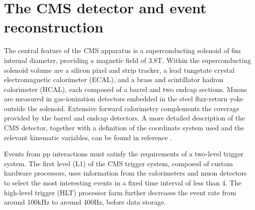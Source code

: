\section{The CMS detector and event reconstruction}
\label{sect:CMSRec}
The central feature of the CMS apparatus is a superconducting solenoid of 6\unit{m} internal diameter, providing a magnetic field of 3.8\unit{T}. Within the superconducting solenoid volume are a silicon pixel and strip tracker, a lead tungstate crystal electromagnetic calorimeter (ECAL), and a brass and scintillator hadron calorimeter (HCAL), each composed of a barrel and two endcap sections. Muons are measured in gas-ionization detectors embedded in the steel flux-return yoke outside the solenoid. Extensive forward calorimetry complements the coverage provided by the barrel and endcap detectors. 
A more detailed description of the CMS detector, together with a definition of the coordinate system used and the relevant kinematic variables, can be found in reference \cite{Chatrchyan:2008zzk}.


Events from pp interactions must satisfy the requirements of a two-level trigger system.
The first level (L1) of the CMS trigger system, composed of custom hardware processors, uses information from the calorimeters and muon detectors to select the most interesting events in a fixed time interval of less than 4\mus. The high-level trigger (HLT) processor farm further decreases the event rate from around 100\unit{kHz} to around 400\unit{Hz}, before data storage. 

